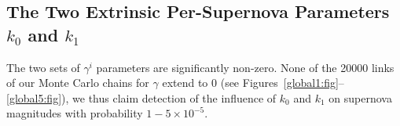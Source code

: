 \documentclass{aastex61}   	%
\begin{document}
\subsection{The Two Extrinsic Per-Supernova Parameters $k_0$ and $k_1$}
The two sets of  $\gamma^i$ parameters  are significantly non-zero. 
None of the 20000 links of 
our Monte Carlo chains for $\gamma$ extend to 0 (see Figures~\ref{global1:fig}--\ref{global5:fig}), we thus claim detection of the
influence of $k_0$ and $k_1$  on supernova magnitudes
with probability $1-5\times 10^{-5}$.
%
%
%
%
%
\end{document}
